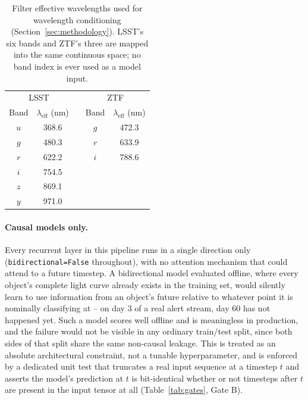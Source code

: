 \begin{table}[htb]
\centering
\caption{Filter effective wavelengths used for wavelength conditioning
(Section~\ref{sec:methodology}). LSST's six bands and ZTF's three are
mapped into the same continuous space; no band index is ever used as a
model input.}
\label{tab:lameff}
\begin{tabular}{ccccc}
\toprule
\multicolumn{2}{c}{LSST} & & \multicolumn{2}{c}{ZTF} \\
Band & $\lambda_\mathrm{eff}$ (nm) & & Band & $\lambda_\mathrm{eff}$ (nm) \\
\midrule
$u$ & 368.6 & & $g$ & 472.3 \\
$g$ & 480.3 & & $r$ & 633.9 \\
$r$ & 622.2 & & $i$ & 788.6 \\
$i$ & 754.5 & & & \\
$z$ & 869.1 & & & \\
$y$ & 971.0 & & & \\
\bottomrule
\end{tabular}
\end{table}

\paragraph{Causal models only.}
Every recurrent layer in this pipeline runs in a single direction only
(\texttt{bidirectional=False} throughout), with no attention mechanism
that could attend to a future timestep. A bidirectional model evaluated
offline, where
every object's complete light curve already exists in the training set,
would silently learn to use information from an object's future relative to
whatever point it is nominally classifying at -- on day 3 of a real alert
stream, day 60 has not happened yet. Such a model scores well offline and is
meaningless in production, and the failure would not be visible in any
ordinary train/test split, since both sides of that split share the same
non-causal leakage. This is treated as an absolute architectural constraint,
not a tunable hyperparameter, and is enforced by a dedicated unit test that
truncates a real input sequence at a timestep $t$ and asserts the model's
prediction at $t$ is bit-identical whether or not timesteps after $t$ are
present in the input tensor at all (Table~\ref{tab:gates}, Gate B).

